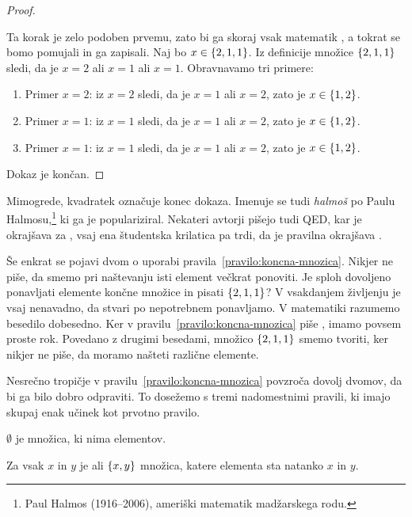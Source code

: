 \begin{proof}
\begin{enumerate}
    Ta korak je zelo podoben prvemu, zato bi ga skoraj vsak matematik ,
    a tokrat se bomo pomujali in ga zapisali.
    Naj bo $x \in \left\{2, 1, 1\right\}$. Iz definicije množice $\left\{2, 1, 1\right\}$ sledi, da je $x = 2$ ali
    $x = 1$ ali $x = 1$. Obravnavamo tri primere:
    \begin{enumerate}
    \item Primer $x = 2$: iz $x = 2$ sledi, da je $x = 1$ ali $x = 2$, zato je $x \in \left\{1, 2\right\}$.
    \item Primer $x = 1$: iz $x = 1$ sledi, da je $x = 1$ ali $x = 2$, zato je $x \in \left\{1, 2\right\}$.
    \item Primer $x = 1$: iz $x = 1$ sledi, da je $x = 1$ ali $x = 2$, zato je $x \in \left\{1, 2\right\}$.
    \end{enumerate}
  \end{enumerate}
  Dokaz je končan.
\end{proof}

Mimogrede, kvadratek označuje konec dokaza. Imenuje se tudi \emph{halmoš} po
Paulu Halmosu,\footnote{Paul Halmos (1916--2006), ameriški matematik madžarskega rodu.} ki ga je populariziral. Nekateri avtorji pišejo tudi QED, kar je okrajšava za , vsaj ena študentska krilatica pa trdi, da je pravilna okrajšava .

Še enkrat se pojavi dvom o uporabi pravila~\ref{pravilo:koncna-mnozica}. Nikjer ne piše, da smemo pri naštevanju isti element večkrat ponoviti. Je sploh dovoljeno ponavljati elemente končne množice in pisati $\left\{2, 1, 1\right\}$?
%
V vsakdanjem življenju je vsaj nenavadno, da stvari po nepotrebnem ponavljamo.
%
V matematiki razumemo besedilo dobesedno. Ker v pravilu~\ref{pravilo:koncna-mnozica} piše , imamo povsem proste rok. Povedano z drugimi besedami, množico
$\left\{2, 1, 1\right\}$ smemo tvoriti, ker nikjer ne piše, da moramo našteti različne elemente.

Nesrečno tropičje v pravilu~\ref{pravilo:koncna-mnozica} povzroča dovolj dvomov, da bi ga bilo dobro odpraviti.
To dosežemo s tremi nadomestnimi pravili, ki imajo skupaj enak učinek kot prvotno pravilo.

\begin{pravilo}
  \label{pravilo:prazna-mnozica}
   $\emptyset$ je množica, ki nima elementov.
\end{pravilo}

\begin{pravilo}
  \label{pravilo:neurejeni-dvojec}
  Za vsak $x$ in $y$ je  ali  $\left\{x, y\right\}$ množica, katere
  elementa sta natanko $x$ in $y$.
\end{pravilo}

